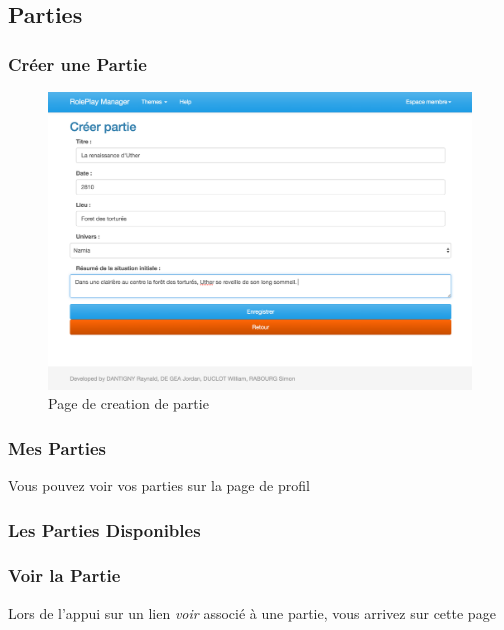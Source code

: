 \documentclass[a4paper,oneside,10pt]{article}
\begin{document}
\subsection{Parties}

\subsubsection{Créer une Partie}
\label{MUCreerPartie}
\begin{figure}[H]
	\begin{center}
		\includegraphics[width=\textwidth]{images/manuel/creerpartie.png}  
		\caption{Page de creation de partie}
	\end{center}
\end{figure}

\subsubsection{Mes Parties}
\label{MUMesParties}

Vous pouvez voir vos parties sur la page de profil

\subsubsection{Les Parties Disponibles}
\label{MULesPartiesDisponibles}

\subsubsection{Voir la Partie}
\label{MUVoirLaPartie}

Lors de l'appui sur un lien \textit{voir} associé à une partie, vous arrivez sur cette page
\end{document}
